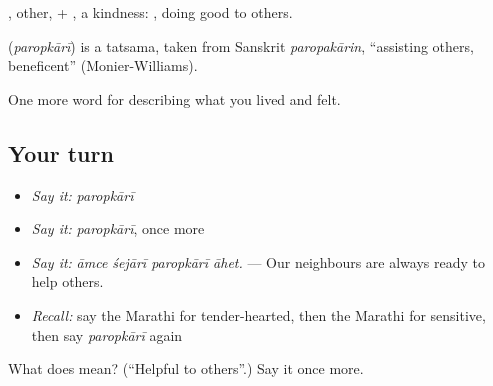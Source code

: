 , other, + , a kindness: , doing good to others.

\begin{cousinweb}
\textbf{} (\emph{paropkārī}) is a tatsama, taken from Sanskrit \emph{paropakārin}, \textquotedblleft{}assisting others, beneficent\textquotedblright{} (Monier-Williams).
\end{cousinweb}

\begin{grammarlens}[title={What you've built}]
One more word for describing what you lived and felt.
\end{grammarlens}

\subsection*{Your turn}
\begin{itemize}
\raggedright
  \item \emph{Say it:} \emph{paropkārī}
  \item \emph{Say it:} \emph{paropkārī}, once more
  \item \emph{Say it:} \emph{āmce śejārī paropkārī āhet.} — Our neighbours are always ready to help others.
  \item \emph{Recall:} say the Marathi for tender-hearted, then the Marathi for sensitive, then say \emph{paropkārī} again
\end{itemize}

\begin{tcolorbox}[breakable,colback=teal!4,colframe=teal!35!black,title={Before you move on}]
What does  mean? (\textquotedblleft{}Helpful to others\textquotedblright{}.) Say it once more.
\end{tcolorbox}
